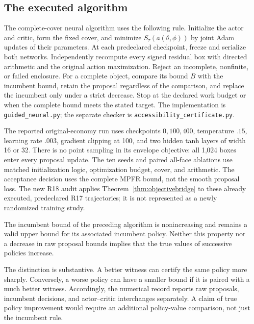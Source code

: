 \subsection{The executed algorithm}
The complete-cover neural algorithm uses the following rule. Initialize the actor and critic, form the fixed cover, and minimize $S_\tau(a(\theta,\phi))$ by joint Adam updates of their parameters. At each predeclared checkpoint, freeze and serialize both networks. Independently recompute every signed residual box with directed arithmetic and the original action maximization. Reject an incomplete, nonfinite, or failed enclosure. For a complete object, compare its bound $B$ with the incumbent bound, retain the proposal regardless of the comparison, and replace the incumbent only under a strict decrease. Stop at the declared work budget or when the complete bound meets the stated target. The implementation is \texttt{guided\_neural.py}; the separate checker is \texttt{accessibility\_certificate.py}.

The reported original-economy run uses checkpoints $0,100,400$, temperature $.15$, learning rate $.003$, gradient clipping at 100, and two hidden tanh layers of width 16 or 32. There is no point sampling in its envelope objective: all 1,024 boxes enter every proposal update. The ten seeds and paired all-face ablations use matched initialization logic, optimization budget, cover, and arithmetic. The acceptance decision uses the complete MPFR bound, not the smooth proposal loss. The new R18 audit applies Theorem~\ref{thm:objectivebridge} to these already executed, predeclared R17 trajectories; it is not represented as a newly randomized training study.

\begin{proposition}\label{prop:certificateacceptance}
The incumbent bound of the preceding algorithm is nonincreasing and remains a valid upper bound for its associated incumbent policy. Neither this property nor a decrease in raw proposal bounds implies that the true values of successive policies increase.
\end{proposition}
The distinction is substantive. A better witness can certify the same policy more sharply. Conversely, a worse policy can have a smaller bound if it is paired with a much better witness. Accordingly, the numerical record reports raw proposals, incumbent decisions, and actor--critic interchanges separately. A claim of true policy improvement would require an additional policy-value comparison, not just the incumbent rule.

